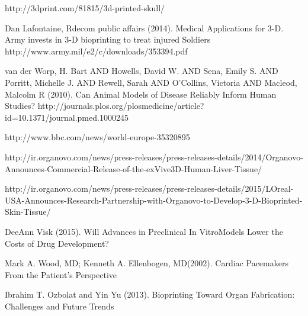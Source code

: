 \documentclass[12pt]{article} %
\begin{document}
\begin{thebibliography}{99}
\begin{small}
\newblock http://3dprint.com/81815/3d-printed-skull/

\newblock Dan Lafontaine, Rdecom public affairs (2014).
\newline Medical Applications for 3-D. Army invests in 3-D bioprinting to treat injured Soldiers
\newblock http://www.army.mil/e2/c/downloads/353394.pdf

\newblock van der Worp, H. Bart AND Howells, David W. AND Sena, Emily S. AND Porritt, Michelle J. AND Rewell, Sarah AND O'Collins, Victoria AND Macleod, Malcolm R
(2010). 
\newline Can Animal Models of Disease Reliably Inform Human Studies?
\newblock http://journals.plos.org/plosmedicine/article?id=10.1371/journal.pmed.1000245

\newblock http://www.bbc.com/news/world-europe-35320895

\newblock http://ir.organovo.com/news/press-releases/press-releases-details/2014/Organovo-Announces-Commercial-Release-of-the-exVive3D-Human-Liver-Tissue/

\newblock http://ir.organovo.com/news/press-releases/press-releases-details/2015/LOreal-USA-Announces-Research-Partnership-with-Organovo-to-Develop-3-D-Bioprinted-Skin-Tissue/

\newblock DeeAnn Visk (2015).
\newline Will Advances in Preclinical In VitroModels Lower the Costs of Drug Development?

\newblock Mark A. Wood, MD; Kenneth A. Ellenbogen, MD(2002).
\newline Cardiac Pacemakers From the Patient’s Perspective

\newblock Ibrahim T. Ozbolat and Yin Yu (2013).
\newline Bioprinting Toward Organ Fabrication: Challenges and Future Trends


\end{small}
\end{thebibliography}

\end{document}
